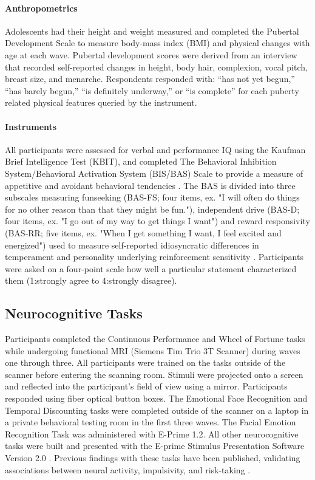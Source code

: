 \documentclass{article}%
\begin{document}
\paragraph*{Anthropometrics} Adolescents had their height and weight measured and completed the Pubertal Development Scale \citep{carskadon1993self} to measure body-mass index (BMI) and physical changes with age at each wave. Pubertal development scores were derived from an interview that recorded self-reported changes in height, body hair, complexion, vocal pitch, breast size, and menarche. Respondents responded with: “has not yet begun,” “has barely begun,” “is definitely underway,” or “is complete” for each puberty related physical features queried by the instrument. 
\paragraph*{Instruments} All participants were assessed for verbal and performance IQ using the Kaufman Brief Intelligence Test (KBIT), \citep{kaufman2004kaufman} and  completed The Behavioral Inhibition System/Behavioral Activation System (BIS/BAS) Scale  to provide a measure of appetitive and avoidant behavioral tendencies \citep{carver1994behavioral}. The BAS is divided into three subscales measuring funseeking (BAS-FS; four items, ex. "I will often do things for no other reason than that they might be fun."), independent drive (BAS-D; four items, ex. "I go out of my way to get things I want") and reward responsivity (BAS-RR; five items, ex. "When I get something I want, I feel excited and energized") used to measure self-reported idiosyncratic differences in temperament and personality underlying reinforcement sensitivity \citep{corr2004reinforcementsensitivity}. Participants were asked on a four-point scale how well a particular statement characterized them (1:strongly agree to 4:strongly disagree).
\subsection*{Neurocognitive Tasks}  Participants completed the Continuous Performance and Wheel of Fortune tasks while undergoing functional MRI (Siemens Tim Trio 3T Scanner) during waves one through three. All participants were trained on the tasks outside of the scanner before entering the scanning room. Stimuli were projected onto a screen and reflected into the participant's field of view using a mirror. Participants responded using fiber optical button boxes. The Emotional Face Recognition and Temporal Discounting tasks were completed outside of the scanner on a laptop in a private behavioral testing room in the first three waves. The Facial Emotion Recognition Task was administered with E-Prime 1.2. All other neurocognitive tasks were built and presented with the E-prime Stimulus Presentation Software Version 2.0 \citep{schneider2002prime}. Previous findings with these tasks have been published, validating associations between neural activity, impulsivity, and risk-taking \citep{darcey2019dietary, darcey2020relationship, trojanowski2021initiation}. 
\end{document}

